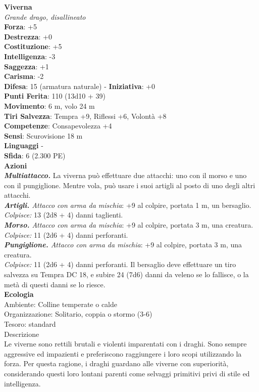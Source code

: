 \begin{multicols}{2}
\medskip\textbf{Viverna}\\
\emph{Grande drago, disallineato}\\
\textbf{Forza}: +5\\
\textbf{Destrezza}: +0\\
\textbf{Costituzione}: +5\\
\textbf{Intelligenza}: -3\\
\textbf{Saggezza}: +1\\
\textbf{Carisma}: -2\\
\textbf{Difesa}: 15 (armatura naturale) - \textbf{Iniziativa}: +0\\
\textbf{Punti Ferita}: 110 (13d10 + 39)\\
\textbf{Movimento}: 6 m, volo 24 m\\
\textbf{Tiri Salvezza}: Tempra +9, Riflessi +6, Volontà +8\\
\textbf{Competenze}: Consapevolezza +4\\
\textbf{Sensi}: Scurovisione 18 m\\
\textbf{Linguaggi} -\\
\textbf{Sfida}: 6 (2.300 PE)\smallskip\\
\smallskip\textbf{Azioni}\\
\emph{\textbf{Multiattacco.}} La viverna può effettuare due attacchi: uno con il morso e uno con il pungiglione. Mentre vola, può usare i suoi artigli al posto di uno degli altri attacchi.\\
\emph{\textbf{Artigli.} Attacco con arma da mischia}: +9 al colpire, portata 1 m, un bersaglio.\\
\emph{Colpisce:} 13 (2d8 + 4) danni taglienti.\\
\emph{\textbf{Morso.} Attacco con arma da mischia}: +9 al colpire, portata 3 m, una creatura.\\
\emph{Colpisce:} 11 (2d6 + 4) danni perforanti.\\
\emph{\textbf{Pungiglione.} Attacco con arma da mischia}: +9 al colpire, portata 3 m, una creatura.\\
\emph{Colpisce:} 11 (2d6 + 4) danni perforanti. Il bersaglio deve effettuare un tiro salvezza su Tempra DC  18, e subire 24 (7d6) danni da veleno se lo fallisce, o la metà di questi danni se lo riesce.\\
\textbf{Ecologia}\\
Ambiente: Colline temperate o calde\\
Organizzazione: Solitario, coppia o stormo (3-6)\\
Tesoro: standard\\
Descrizione\\
Le viverne sono rettili brutali e violenti imparentati con i draghi. Sono sempre aggressive ed impazienti e preferiscono raggiungere i loro scopi utilizzando la forza. Per questa ragione, i draghi guardano alle viverne con superiorità, considerando questi loro lontani parenti come selvaggi primitivi privi di stile ed intelligenza.\\


\end{multicols}
